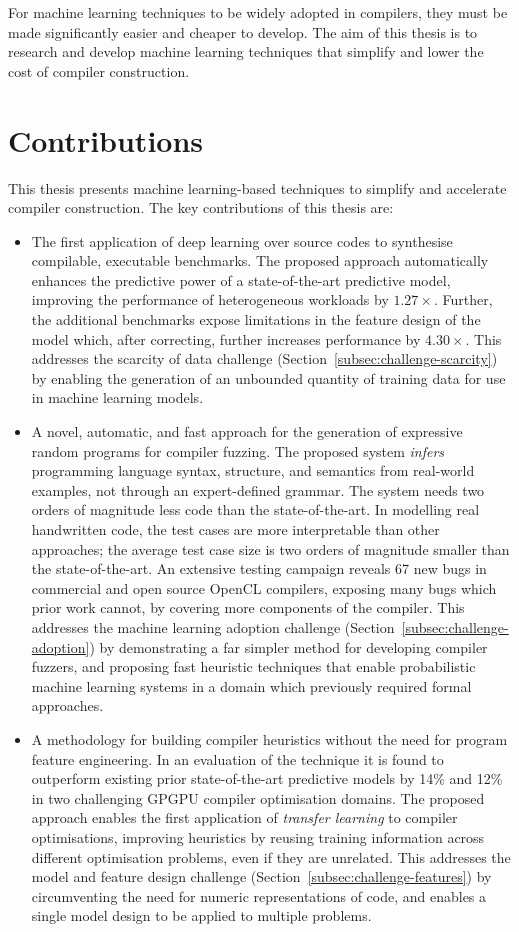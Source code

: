 For machine learning techniques to be widely adopted in compilers, they must be made significantly easier and cheaper to develop. The aim of this thesis is to research and develop machine learning techniques that simplify and lower the cost of compiler construction.


\newpage
\section{Contributions}

This thesis presents machine learning-based techniques to simplify and accelerate compiler construction. The key contributions of this thesis are:

\begin{itemize}
  \item The first application of deep learning over source codes to synthesise compilable, executable benchmarks. The proposed approach automatically enhances the predictive power of a state-of-the-art predictive model, improving the performance of heterogeneous workloads by $1.27\times$. Further, the additional benchmarks expose limitations in the feature design of the model which, after correcting, further increases performance by $4.30\times$. This addresses the scarcity of data challenge (Section~\ref{subsec:challenge-scarcity}) by enabling the generation of an unbounded quantity of training data for use in machine learning models.
  \item A novel, automatic, and fast approach for the generation of expressive random programs for compiler fuzzing. The proposed system \emph{infers} programming language syntax, structure, and semantics from real-world examples, not through an expert-defined grammar. The system needs two orders of magnitude less code than the state-of-the-art. In modelling real handwritten code, the test cases are more interpretable than other approaches; the average test case size is two orders of magnitude smaller than the state-of-the-art. An extensive testing campaign reveals 67 new bugs in commercial and open source OpenCL compilers, exposing many bugs which prior work cannot, by covering more components of the compiler. This addresses the machine learning adoption challenge (Section~\ref{subsec:challenge-adoption}) by demonstrating a far simpler method for developing compiler fuzzers, and proposing fast heuristic techniques that enable probabilistic machine learning systems in a domain which previously required formal approaches.
  \item A methodology for building compiler heuristics without the need for program feature engineering. In an evaluation of the technique it is found to outperform existing prior  state-of-the-art predictive models by 14\% and 12\% in two challenging GPGPU compiler optimisation domains. The proposed approach enables the first application of \emph{transfer learning} to compiler optimisations, improving heuristics by reusing training information across different optimisation problems, even if they are unrelated. This addresses the model and feature design challenge (Section~\ref{subsec:challenge-features}) by circumventing the need for numeric representations of code, and enables a single model design to be applied to multiple problems.

\end{itemize}
